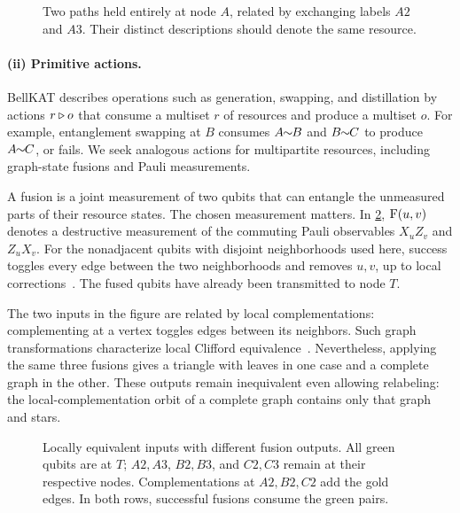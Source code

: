 \begin{figure}[t]
    \centering
    
    \caption{Two paths held entirely at node $A$, related by exchanging labels $A2$ and $A3$. Their distinct descriptions should denote the same resource.}
    \label{fig:lp}
\end{figure}

\paragraph{(ii) Primitive actions.}
BellKAT describes operations such as generation, swapping, and distillation by actions $r \triangleright o$ that consume a multiset $r$ of resources and produce a multiset $o$. For example, entanglement swapping at $B$ consumes $A \!\!\sim\!\! B$ and $B \!\!\sim\!\! C$ to produce $A \!\!\sim\!\! C$, or fails. We seek analogous actions for multipartite resources, including graph-state fusions and Pauli measurements.

A fusion is a joint measurement of two qubits that can entangle the unmeasured parts of their resource states. The chosen measurement matters. In \cref{fig:LC-input-nonLC-output}, $\mathrm{F}(u,v)$ denotes a destructive measurement of the commuting Pauli observables $X_uZ_v$ and $Z_uX_v$. For the nonadjacent qubits with disjoint neighborhoods used here, success toggles every edge between the two neighborhoods and removes $u,v$, up to local corrections~\cite{loebl2025bellfusion}. The fused qubits have already been transmitted to node $T$.

The two inputs in the figure are related by local complementations: complementing at a vertex toggles edges between its neighbors. Such graph transformations characterize local Clifford equivalence~\cite{vandennest2004graphical}. Nevertheless, applying the same three fusions gives a triangle with leaves in one case and a complete graph in the other. These outputs remain inequivalent even allowing relabeling: the local-complementation orbit of a complete graph contains only that graph and stars.

\begin{figure}[t]
    \centering
    
    \caption{Locally equivalent inputs with different fusion outputs. All green qubits are at $T$; $A2,A3$, $B2,B3$, and $C2,C3$ remain at their respective nodes. Complementations at $A2,B2,C2$ add the gold edges. In both rows, successful fusions consume the green pairs.}
    \label{fig:LC-input-nonLC-output}
\end{figure}

